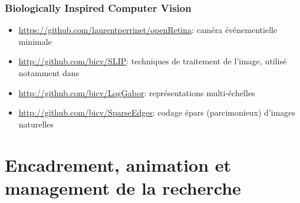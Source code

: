 \subsubsection{Biologically Inspired Computer Vision} %
\begin{itemize}
	\item \url{https://github.com/laurentperrinet/openRetina}: caméra événementielle minimale
	\item \url{http://github.com/bicv/SLIP}: techniques de traitement de l'image, utilisé notamment dans~\citep{Perrinet15bicv,Ravello16droplets,PerrinetBednar15,Perrinet15eusipco,Perrinet16EUVIP}
	\item \url{http://github.com/bicv/LogGabor}: représentations multi-échelles~\citep{Fischer07,Fischer07cv}
	\item \url{http://github.com/bicv/SparseEdges}: codage épars (parcimonieux) d'images naturelles~\citep{Perrinet15bicv}
\end{itemize}



\section{Encadrement, animation et management de la recherche}



